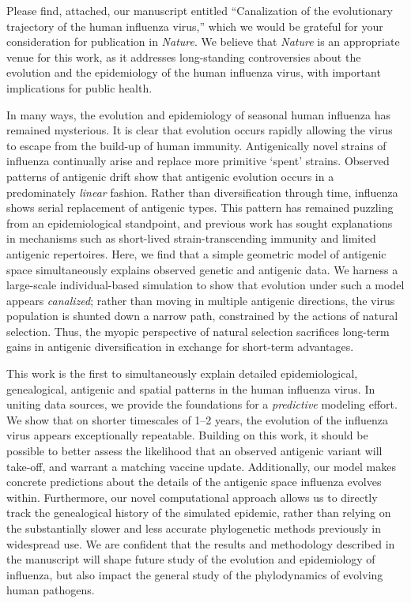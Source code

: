 \documentclass[stdletter,letterpaper,addrfromright,orderfromdateto,dateleft,11pt,noaddrto,noaddrfrom,sigleft]{newlfm}
\begin{document}
\begin{newlfm}

Please find, attached, our manuscript entitled ``Canalization of the evolutionary trajectory of the human influenza virus,'' which we would be grateful for your consideration for publication in \textsl{Nature}.  We believe that \textsl{Nature} is an appropriate venue for this work, as it addresses long-standing controversies about the evolution and the epidemiology of the human influenza virus, with important implications for public health.

In many ways, the evolution and epidemiology of seasonal human influenza has remained mysterious.  It is clear that evolution occurs rapidly allowing the virus to escape from the build-up of human immunity.  Antigenically novel strains of influenza continually arise and replace more primitive `spent' strains.  Observed patterns of antigenic drift show that antigenic evolution occurs in a predominately \textsl{linear} fashion.  Rather than diversification through time, influenza shows serial replacement of antigenic types.  This pattern has remained puzzling from an epidemiological standpoint, and previous work has sought explanations in mechanisms such as short-lived strain-transcending immunity and limited antigenic repertoires.  Here, we find that a simple geometric model of antigenic space simultaneously explains observed genetic and antigenic data.  We harness a large-scale individual-based simulation to show that evolution under such a model appears \textsl{canalized}; rather than moving in multiple antigenic directions, the virus population is shunted down a narrow path, constrained by the actions of natural selection.  Thus, the myopic perspective of natural selection sacrifices long-term gains in antigenic diversification in exchange for short-term advantages.

This work is the first to simultaneously explain detailed epidemiological, genealogical, antigenic and spatial patterns in the human influenza virus.  In uniting data sources, we provide the foundations for a \textsl{predictive} modeling effort.  We show that on shorter timescales of 1--2 years, the evolution of the influenza virus appears exceptionally repeatable.  Building on this work, it should be possible to better assess the likelihood that an observed antigenic variant will take-off, and warrant a matching vaccine update.  Additionally, our model makes concrete predictions about the details of the antigenic space influenza evolves within.  Furthermore, our novel computational approach allows us to directly track the genealogical history of the simulated epidemic, rather than relying on the substantially slower and less accurate phylogenetic methods previously in widespread use.  We are confident that the results and methodology described in the manuscript will shape future study of the evolution and epidemiology of influenza, but also impact the general study of the phylodynamics of evolving human pathogens.


\end{newlfm}
\end{document}
